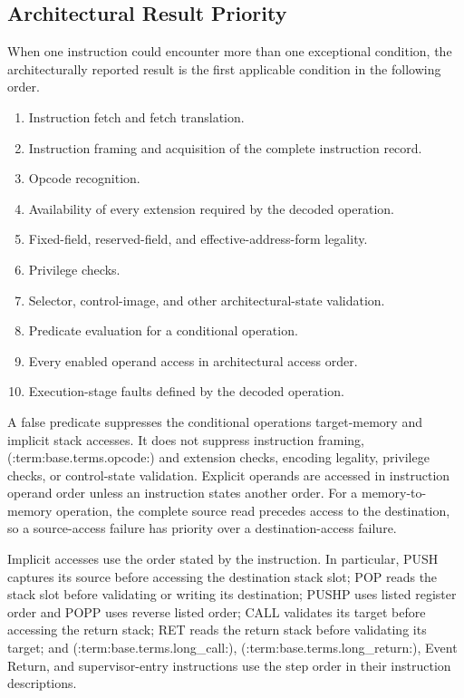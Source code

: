 \subsection{Architectural Result Priority}
When one instruction could encounter more than one exceptional condition, the architecturally reported result is
the first applicable condition in the following order.

\begin{enumerate}
\item Instruction fetch and fetch translation.
\item Instruction framing and acquisition of the complete instruction record.
\item Opcode recognition.
\item Availability of every extension required by the decoded operation.
\item Fixed-field, reserved-field, and effective-address-form legality.
\item Privilege checks.
\item Selector, control-image, and other architectural-state validation.
\item Predicate evaluation for a conditional operation.
\item Every enabled operand access in architectural access order.
\item Execution-stage faults defined by the decoded operation.
\end{enumerate}

A false predicate suppresses the conditional operation\textquotesingle{}s target-memory and implicit stack accesses. It does not
suppress instruction framing, (:term:base.terms.opcode:) and extension checks, encoding legality, privilege checks, or control-state
validation. Explicit operands are accessed in instruction operand order unless an instruction states another order.
For a memory-to-memory operation, the complete source read precedes access to the destination, so a source-access
failure has priority over a destination-access failure.

Implicit accesses use the order stated by the instruction. In particular, PUSH captures its source before accessing
the destination stack slot; POP reads the stack slot before validating or writing its destination; PUSHP uses listed
register order and POPP uses reverse listed order; CALL validates its target before accessing the return stack; RET
reads the return stack before validating its target; and (:term:base.terms.long_call:), (:term:base.terms.long_return:), Event Return, and supervisor-entry
instructions use the step order in their instruction descriptions.
